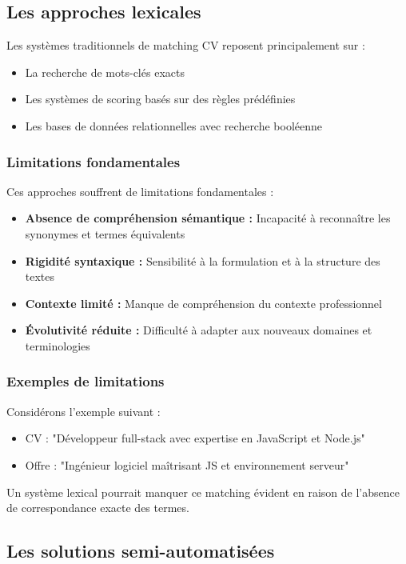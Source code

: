 \documentclass[12pt,a4paper]{report}
\begin{document}
\subsection{Les approches lexicales}

Les systèmes traditionnels de matching CV reposent principalement sur :
\begin{itemize}
\item La recherche de mots-clés exacts
\item Les systèmes de scoring basés sur des règles prédéfinies
\item Les bases de données relationnelles avec recherche booléenne
\end{itemize}

\subsubsection{Limitations fondamentales}

Ces approches souffrent de limitations fondamentales :
\begin{itemize}
\item \textbf{Absence de compréhension sémantique :} Incapacité à reconnaître les synonymes et termes équivalents
\item \textbf{Rigidité syntaxique :} Sensibilité à la formulation et à la structure des textes
\item \textbf{Contexte limité :} Manque de compréhension du contexte professionnel
\item \textbf{Évolutivité réduite :} Difficulté à adapter aux nouveaux domaines et terminologies
\end{itemize}

\subsubsection{Exemples de limitations}

Considérons l'exemple suivant :
\begin{itemize}
\item CV : "Développeur full-stack avec expertise en JavaScript et Node.js"
\item Offre : "Ingénieur logiciel maîtrisant JS et environnement serveur"
\end{itemize}

Un système lexical pourrait manquer ce matching évident en raison de l'absence de correspondance exacte des termes.

\subsection{Les solutions semi-automatisées}
\end{document}
